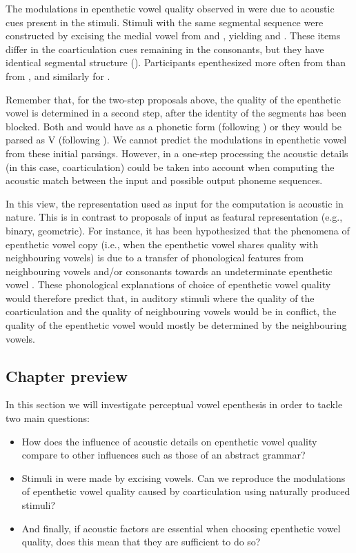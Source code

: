 The modulations in epenthetic vowel quality observed in \cite{dupoux2011} were due to acoustic cues present in the stimuli. Stimuli with the same segmental sequence were constructed by excising the medial vowel from  and , yielding  and . These items differ in the coarticulation cues remaining in the consonants, but they have identical segmental structure (). Participants epenthesized  more often from  than from , and similarly for .

Remember that, for the two-step proposals above, the quality of the epenthetic vowel is determined in a second step, after the identity of the segments has been blocked. Both  and  would have  as a phonetic form (following \cite{berent2007}) or they would be parsed as V (following \cite{monahan2009}). We cannot predict the modulations in epenthetic vowel from these initial parsings. However, in a one-step processing the acoustic details (in this case, coarticulation) could be taken into account when computing the acoustic match between the input and possible output phoneme sequences. 

In this view, the representation used as input for the computation is acoustic in nature. This is in contrast to proposals of input as featural representation (e.g., binary, geometric). For instance, it has been hypothesized that the phenomena of epenthetic vowel copy (i.e., when the epenthetic vowel shares quality with neighbouring vowels) is due to a transfer of phonological features from neighbouring vowels and/or consonants towards an undeterminate epenthetic vowel \cite{rose2006, uffmann2006}. These phonological explanations of choice of epenthetic vowel quality would therefore predict that, in auditory stimuli where the quality of the coarticulation and the quality of neighbouring vowels would be in conflict, the quality of the epenthetic vowel would mostly be determined by the neighbouring vowels.      

\subsection{Chapter preview}

In this section we will investigate perceptual vowel epenthesis in order to tackle two main questions: 

\begin{itemize}
\item How does the influence of acoustic details on epenthetic vowel quality compare to other influences such as those of an abstract grammar?
\item Stimuli in \cite{dupoux2011} were made by excising vowels. Can we reproduce the modulations of epenthetic vowel quality caused by coarticulation using naturally produced stimuli?
\item And finally, if acoustic factors are essential when choosing epenthetic vowel quality, does this mean that they are sufficient to do so?
\end{itemize}

